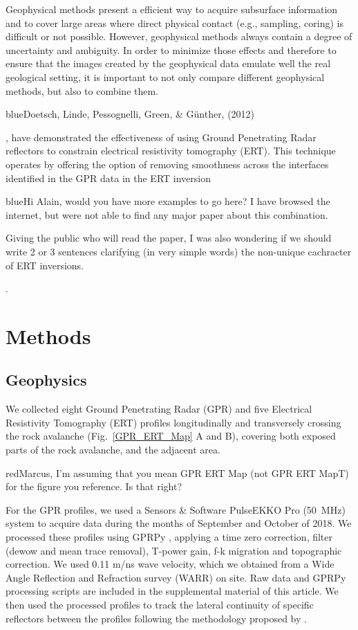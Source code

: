 \documentclass[5p]{elsarticle}
\newcommand{\COMON}{\begin{color}{blue}}
\newcommand{\COMOFF}{\end{color}}
\newcommand{\alon}{\begin{color}{red}}
\newcommand{\aloff}{\end{color}}
\begin{document}
Geophysical methods present a efficient way to acquire subsurface information and  to cover large areas where direct physical contact (e.g., sampling, coring) is difficult or not possible. However, geophysical methods always contain a degree of  uncertainty and ambiguity. In order to minimize those effects and therefore to ensure that the images created by the geophysical data emulate well the real geological setting, it is important to not only compare different geophysical methods, but also to combine them. \COMON Doetsch, Linde, Pessognelli, Green, \& G\"unther, (2012)\COMOFF, have demonstrated the effectiveness of using Ground Penetrating Radar reflectors to constrain electrical resistivity tomography (ERT). This technique operates by offering the option of removing smoothness across the interfaces identified in the GPR data in the ERT inversion 

\COMON Hi Alain, would you have more examples to go here? I have browsed the internet, but were not able to find any major paper about this combination. 

    Giving the public who will read the paper, I was also wondering if we should write 2 or 3 sentences clarifying (in very simple words) the  non-unique cachracter of ERT inversions.\COMOFF.  



\bigskip   



\section{Methods}

\subsection{Geophysics}

We collected eight Ground Penetrating Radar
    (GPR) and five Electrical Resistivity Tomography (ERT) profiles
    longitudinally and transversely crossing the rock avalanche
    (Fig.~\ref{GPR_ERT_Map} A and B), covering both exposed parts of the rock
    avalanche, and the adjacent area.\alon Marcus, I'm assuming that
    you mean GPR ERT Map (not GPR ERT MapT) for the figure you
    reference. Is that right? \aloff

For the GPR profiles, we used a Sensors \& Software PulseEKKO Pro (\SI{50}{\mega Hz}) system to acquire data during the months of September and October of 2018. We processed these profiles using GPRPy \citep{plattner2019comunity,Plattner2019}, applying a time zero correction, filter (dewow and mean trace removal), T-power gain, f-k migration \citep{stolt1978migration} and topographic correction. We used 0.11 m/ns wave velocity, which we obtained from a Wide Angle Reflection and Refraction survey (WARR) on site. Raw data and GPRPy processing scripts are included in the supplemental material of this article. We then used the processed profiles to track the lateral continuity of specific reflectors between the profiles following the methodology proposed by \citep{mitchum1977seismic}.
\end{document}
